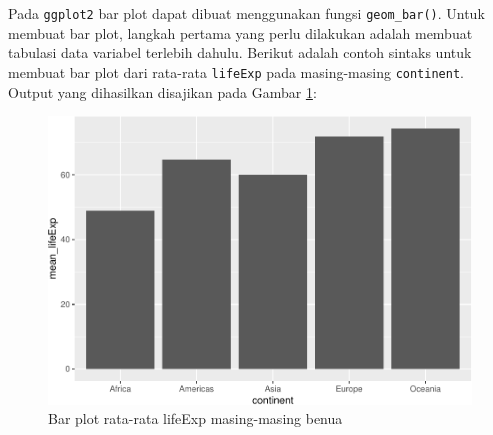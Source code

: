 \documentclass[]{book}
\newenvironment{Shaded}{\begin{snugshade}}{\end{snugshade}}
\newcommand{\KeywordTok}[1]{\textcolor[rgb]{0.13,0.29,0.53}{\textbf{#1}}}
\newcommand{\DataTypeTok}[1]{\textcolor[rgb]{0.13,0.29,0.53}{#1}}
\newcommand{\StringTok}[1]{\textcolor[rgb]{0.31,0.60,0.02}{#1}}
\newcommand{\CommentTok}[1]{\textcolor[rgb]{0.56,0.35,0.01}{\textit{#1}}}
\newcommand{\OperatorTok}[1]{\textcolor[rgb]{0.81,0.36,0.00}{\textbf{#1}}}
\newcommand{\NormalTok}[1]{#1}
\begin{document}
Pada \texttt{ggplot2} bar plot dapat dibuat menggunakan fungsi
\texttt{geom\_bar()}. Untuk membuat bar plot, langkah pertama yang perlu
dilakukan adalah membuat tabulasi data variabel terlebih dahulu. Berikut
adalah contoh sintaks untuk membuat bar plot dari rata-rata
\texttt{lifeExp} pada masing-masing \texttt{continent}. Output yang
dihasilkan disajikan pada Gambar \ref{fig:ggbar}:

\begin{Shaded}
\end{Shaded}

\begin{figure}

{\centering \includegraphics[width=0.7\linewidth]{EnvStat_files/figure-latex/ggbar-1} 

}

\caption{Bar plot rata-rata lifeExp masing-masing benua}\label{fig:ggbar}
\end{figure}
\end{document}
